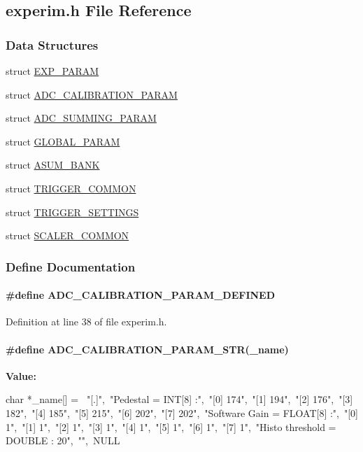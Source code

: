 \subsection{experim.h File Reference}
\label{experim_8h}
\subsubsection*{Data Structures}
\begin{DoxyCompactItemize}
\item 
struct \hyperlink{structEXP__PARAM}{EXP\_\-PARAM}
\item 
struct \hyperlink{structADC__CALIBRATION__PARAM}{ADC\_\-CALIBRATION\_\-PARAM}
\item 
struct \hyperlink{structADC__SUMMING__PARAM}{ADC\_\-SUMMING\_\-PARAM}
\item 
struct \hyperlink{structGLOBAL__PARAM}{GLOBAL\_\-PARAM}
\item 
struct \hyperlink{structASUM__BANK}{ASUM\_\-BANK}
\item 
struct \hyperlink{structTRIGGER__COMMON}{TRIGGER\_\-COMMON}
\item 
struct \hyperlink{structTRIGGER__SETTINGS}{TRIGGER\_\-SETTINGS}
\item 
struct \hyperlink{structSCALER__COMMON}{SCALER\_\-COMMON}
\end{DoxyCompactItemize}


\subsubsection{Define Documentation}
\paragraph[{ADC\_\-CALIBRATION\_\-PARAM\_\-DEFINED}]{\setlength{\rightskip}{0pt plus 5cm}\#define ADC\_\-CALIBRATION\_\-PARAM\_\-DEFINED}\hfill\label{experim_8h_ae46770bb923aa37c57ac68d9100f0296}


Definition at line 38 of file experim.h.
\paragraph[{ADC\_\-CALIBRATION\_\-PARAM\_\-STR}]{\setlength{\rightskip}{0pt plus 5cm}\#define ADC\_\-CALIBRATION\_\-PARAM\_\-STR(\_\-name)}\hfill\label{experim_8h_a875fd22707dc840a9789287c0f294f79}
{\bfseries Value:}
\begin{DoxyCode}
char *_name[] = {\
"[.]",\
"Pedestal = INT[8] :",\
"[0] 174",\
"[1] 194",\
"[2] 176",\
"[3] 182",\
"[4] 185",\
"[5] 215",\
"[6] 202",\
"[7] 202",\
"Software Gain = FLOAT[8] :",\
"[0] 1",\
"[1] 1",\
"[2] 1",\
"[3] 1",\
"[4] 1",\
"[5] 1",\
"[6] 1",\
"[7] 1",\
"Histo threshold = DOUBLE : 20",\
"",\
NULL }
\end{DoxyCode}


